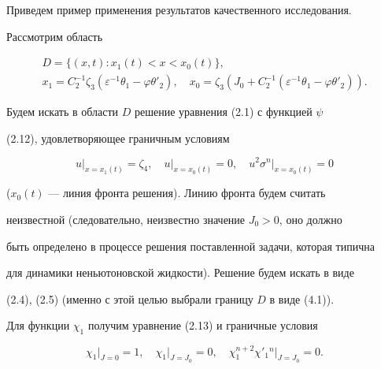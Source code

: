  


Приведем пример применения результатов качественного исследования. 


Рассмотрим область 


\begin{equation} 


\begin{array}{c} 


D=\{(x,t):x_1(t)<x<x_0(t)\}, \\[2mm] 


x_1=C^{-1}_2\zeta_3(\varepsilon^{-1}\theta_1-\varphi\theta'_2),\quad 


x_0=\zeta_3(J_0+C^{-1}_2(\varepsilon^{-1}\theta_1-\varphi\theta'_2)). 


\end{array} 


\tag{4.1} 


\end{equation} 


Будем искать в области $D$ решение уравнения (2.1) с функцией $\psi$ 


(2.12), удовлетворяющее граничным условиям 


\begin{equation} 


u\big|_{x=x_1(t)}=\zeta_4,\quad 


u\big|_{x=x_0(t)}=0,\quad 


u^2\sigma^n\big|_{x=x_0(t)}=0 


\tag{4.2} 


\end{equation} 


($x_0(t)$ --- линия фронта решения). Линию фронта будем считать 


неизвестной (следовательно, неизвестно значение $J_0>0$, оно должно 


быть определено в процессе решения поставленной задачи, которая типична 


для динамики неньютоновской жидкости). Решение будем искать в виде 


(2.4), (2.5) (именно с этой целью выбрали границу $D$ в виде (4.1)). 


Для функции $\chi_1$ получим уравнение (2.13) и граничные условия 


\begin{equation} 


\chi_1\big|_{J=0}=1,\quad \chi_1\big|_{J=J_0}=0,\quad 


\chi^{n+2}_1\chi'_1{}^n\big|_{J=J_0}=0. 


\tag{4.3} 


\end{equation} 



